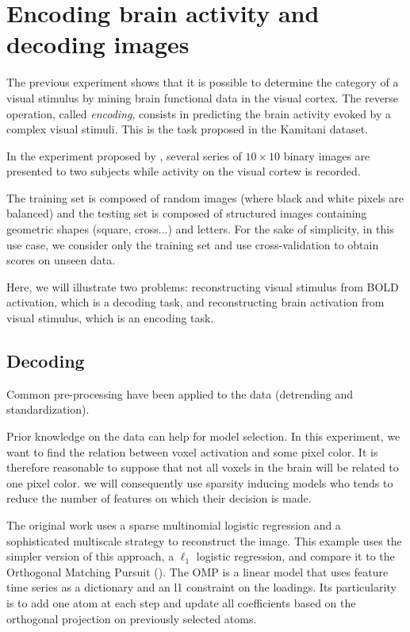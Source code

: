 \documentclass{frontiersSCNS} %
\newcounter{x}
\newcounter{y}
\newcounter{z}
\begin{document}
\section{Encoding brain activity and decoding images}
\label{kamitani}

The previous experiment shows that it is possible to determine the category of a
visual stimulus by mining brain functional data in the visual cortex.
The reverse operation, called \textit{encoding}, consists in predicting the
brain activity evoked by a complex visual stimuli.
This is the task proposed in the Kamitani dataset.

In the experiment proposed by \citep{miyawaki2008}, several series of $10\times10$ binary images are presented
to two subjects while activity on the visual cortew is recorded.

The training set is composed of random images (where black and white pixels
are balanced) and the testing set is composed of structured images containing
geometric shapes (square, cross...) and letters. For the sake of simplicity, in
this use case, we consider only the training set and use cross-validation to
obtain scores on unseen data.

Here, we will illustrate two problems: reconstructing visual stimulus from BOLD activation,
which is a decoding task, and reconstructing brain activation from visual
stimulus, which is an encoding task.

\subsection{Decoding}

Common pre-processing have been applied to the data (detrending and
standardization).

Prior knowledge on the data can help for model selection. In this experiment, we
want to find the relation between voxel activation and some pixel color. It is
therefore reasonable to suppose that not all voxels in the brain will be related to one
pixel color. we will consequently use sparsity inducing models who tends to
reduce the number of features on which their decision is made.

The original work uses a sparse multinomial
logistic regression and a sophisticated multiscale strategy to reconstruct the image.
This example uses the simpler version of this approach, a $\ell_1$ logistic
regression, and compare it to the Orthogonal
Matching Pursuit (\cite{mallat1993}). The OMP is a linear model that uses
feature time series as a dictionary and an l1 constraint on the loadings. Its
particularity is to add one atom at each step and update all coefficients
based on the orthogonal projection on previously selected atoms.
\end{document}
